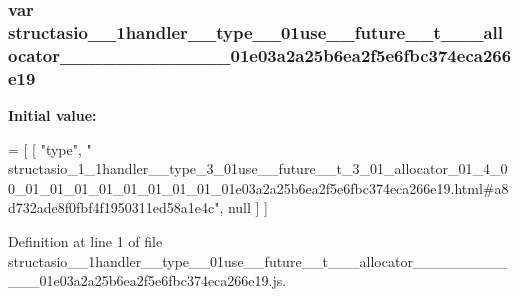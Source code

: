 \subsubsection[{structasio\+\_\+1\+\_\+1handler\+\_\+\+\_\+type\+\_\+3\+\_\+01use\+\_\+\+\_\+future\+\_\+\+\_\+t\+\_\+3\+\_\+01\+\_\+allocator\+\_\+01\+\_\+4\+\_\+00\+\_\+01\+\_\+01\+\_\+01\+\_\+01\+\_\+01\+\_\+01\+\_\+01\+\_\+01\+\_\+01e03a2a25b6ea2f5e6fbc374eca266e19}]{\setlength{\rightskip}{0pt plus 5cm}var structasio\+\_\+\_\+1handler\+\_\+\+\_\+type\+\_\+\_\+01use\+\_\+\+\_\+future\+\_\+\+\_\+t\+\_\+\_\+\_\+allocator\+\_\+\_\+\_\+\_\+\_\+\_\+\_\+\_\+\_\+\_\+\_\+\_\+01e03a2a25b6ea2f5e6fbc374eca266e19}\label{structasio__1__1handler____type__3__01use____future____t__3__01__allocator__01__4__00__01__01__01db3d95d9d27069a8236572896dd48f5_a625ce58a869e16660ca231c0ad423edd}
{\bfseries Initial value\+:}
\begin{DoxyCode}
=
[
    [ \textcolor{stringliteral}{"type"}, \textcolor{stringliteral}{"
      structasio\_1\_1handler\_\_type\_3\_01use\_\_future\_\_t\_3\_01\_allocator\_01\_4\_00\_01\_01\_01\_01\_01\_01\_01\_01\_01e03a2a25b6ea2f5e6fbc374eca266e19.html#a8d732ade8f0fbf4f1950311ed58a1e4c"}, null ]
]
\end{DoxyCode}


Definition at line 1 of file structasio\+\_\+\_\+1handler\+\_\+\+\_\+type\+\_\+\_\+01use\+\_\+\+\_\+future\+\_\+\+\_\+t\+\_\+\_\+\_\+allocator\+\_\+\_\+\_\+\_\+\_\+\_\+\_\+\_\+\_\+\_\+\_\+\_\+01e03a2a25b6ea2f5e6fbc374eca266e19.\+js.

